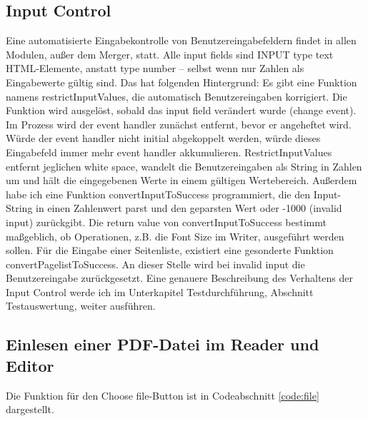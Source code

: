 \subsection{Input Control}
Eine automatisierte Eingabekontrolle von Benutzereingabefeldern findet in allen Modulen, außer dem Merger, statt. Alle input fields sind INPUT type text HTML-Elemente, anstatt type number – selbst wenn nur Zahlen als Eingabewerte gültig sind. Das hat folgenden Hintergrund: Es gibt eine Funktion namens restrictInputValues, die automatisch Benutzereingaben korrigiert. Die Funktion wird ausgelöst, sobald das input field verändert wurde (change event). Im Prozess wird der event handler zunächst entfernt, bevor er angeheftet wird. Würde der event handler nicht initial abgekoppelt werden, würde dieses Eingabefeld immer mehr event handler akkumulieren. RestrictInputValues entfernt jeglichen white space, wandelt die Benutzereingaben als String in Zahlen um und hält die eingegebenen Werte in einem gültigen Wertebereich. Außerdem habe ich eine Funktion convertInputToSuccess programmiert, die den Input-String in einen Zahlenwert parst und den geparsten Wert oder -1000 (invalid input) zurückgibt. Die return value von convertInputToSuccess bestimmt maßgeblich, ob Operationen, z.B. die Font Size im Writer, ausgeführt werden sollen. Für die Eingabe einer Seitenliste, existiert eine gesonderte Funktion convertPagelistToSuccess. An dieser Stelle wird bei invalid input die Benutzereingabe zurückgesetzt. Eine genauere Beschreibung des Verhaltens der Input Control werde ich im Unterkapitel Testdurchführung, Abschnitt Testauswertung, weiter ausführen.

\subsection{Einlesen einer PDF-Datei im Reader und Editor}
Die Funktion für den Choose file-Button ist in Codeabschnitt \ref{code:file} dargestellt.

